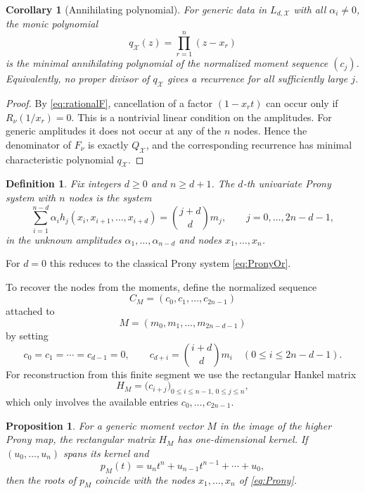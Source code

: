 \documentclass[reqno]{amsart}
\numberwithin{theorem}{section}
\newtheorem{proposition}[theorem]{Proposition}
\newtheorem{corollary}[theorem]{Corollary}
\newtheorem{definition}[theorem]{Definition}
\newcommand{\cX}{\mathcal{X}}
\newcommand{\al}{\alpha}
\begin{document}
\begin{corollary}[Annihilating polynomial]\label{cor:annihilating}
For generic data in $L_{d,\cX}$ with all $\alpha_i\ne 0$, the monic polynomial
\[
q_\cX(z)=\prod_{r=1}^{n}(z-x_r)
\]
is the minimal annihilating polynomial of the normalized moment sequence $(c_j)$.
Equivalently, no proper divisor of $q_\cX$ gives a recurrence for all sufficiently large $j$.
\end{corollary}

\begin{proof}
By \eqref{eq:rationalF}, cancellation of a factor $(1-x_rt)$ can occur only if
$R_\nu(1/x_r)=0$. This is a nontrivial linear condition on the amplitudes. For generic amplitudes it does not occur at any of the $n$ nodes. Hence the denominator of $F_\nu$ is exactly $Q_\cX$, and the corresponding recurrence has minimal characteristic polynomial $q_\cX$.
\end{proof}

\begin{definition}
Fix integers $d\ge 0$ and $n\ge d+1$. The \emph{$d$-th univariate Prony system with $n$ nodes} is the system
\begin{equation}\label{eq:Prony}
\sum_{i=1}^{n-d} \al_i h_j(x_i,x_{i+1},\dots,x_{i+d}) = \binom{j+d}{d}m_j,
\qquad j=0,\dots,2n-d-1,
\end{equation}
in the unknown amplitudes $\al_1,\dots,\al_{n-d}$ and nodes $x_1,\dots,x_n$.
\end{definition}

For $d=0$ this reduces to the classical Prony system \eqref{eq:PronyOr}.

To recover the nodes from the moments, define the normalized sequence
\[
C_M=(c_0,c_1,\dots,c_{2n-1})
\]
attached to
\[
M=(m_0,m_1,\dots,m_{2n-d-1})
\]
by setting
\[
c_0=c_1=\cdots=c_{d-1}=0, \qquad c_{d+i}=\binom{i+d}{d}m_i \quad (0\le i\le 2n-d-1).
\]
For reconstruction from this finite segment we use the rectangular Hankel matrix
\[
H_M=\bigl(c_{i+j}\bigr)_{0\le i\le n-1,\,0\le j\le n},
\]
which only involves the available entries $c_0,\dots,c_{2n-1}$.

\begin{proposition}\label{prop:nodes}
For a generic moment vector $M$ in the image of the higher Prony map, the rectangular matrix $H_M$ has one-dimensional kernel. If $(u_0,\dots,u_n)$ spans its kernel and
\[
p_M(t)=u_nt^n+u_{n-1}t^{n-1}+\cdots+u_0,
\]
then the roots of $p_M$ coincide with the nodes $x_1,\dots,x_n$ of \eqref{eq:Prony}.
\end{proposition}
\end{document}
